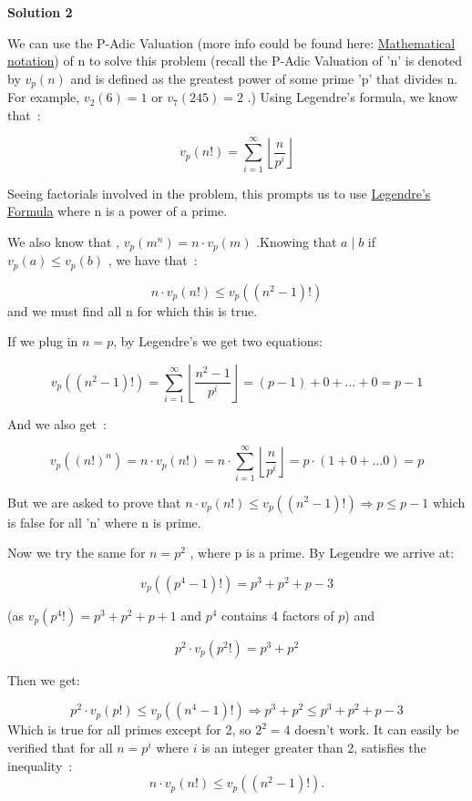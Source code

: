 \begin{enumerate}
\textbf{Solution 2}

We can use the P-Adic Valuation (more info could be found here: \href{https://artofproblemsolving.com/wiki/index.php?title=Mathematical\_notation}{Mathematical notation}) of n to solve this problem (recall the P-Adic Valuation of 'n' is denoted by $v_p (n)$ and is defined as the greatest power of some prime 'p' that divides n. For example, $v_2 (6)=1$ or $v_7 (245)=2$ .) Using Legendre's formula, we know that :

 
 \[v_p (n!)= \sum_{i=1}^\infty  \left\lfloor \frac {n}{p^i} \right\rfloor\]

 Seeing factorials involved in the problem, this prompts us to use \href{https://artofproblemsolving.com/wiki/index.php?title=Legendre\%27s\_Formula}{Legendre's Formula} where n is a power of a prime.

 We also know that , $v_p (m^n) = n \cdot v_p (m)$ .Knowing that $a\mid b$ if $v_p (a) \le v_p (b)$ , we have that :

 
 \[n \cdot v_p (n!) \le v_p ((n^2 -1 )!)\] and we must find all n for which this is true.

 If we plug in $n=p$, by Legendre's we get two equations:

 
 \[v_p ((n^2 -1)!) = \sum_{i=1}^\infty  \left\lfloor \frac {n^2 -1}{p^i} \right\rfloor = (p-1)+0+...+0 = p-1\]

 And we also get :

 
 \[v_p ((n!)^n) = n \cdot v_p (n!)= n \cdot \sum_{i=1}^\infty   \left\lfloor \frac {n}{p^i} \right\rfloor = p \cdot ( 1+0+...0) = p\]

 But we are asked to prove that $n \cdot v_p (n!) \le v_p ((n^2 -1 )!) \Longrightarrow p \le p-1$ which is false for all 'n' where n is prime.

 Now we try the same for $n=p^2$ , where p is a prime. By Legendre we arrive at:

 
 \[v_p ((p^4 -1)!) = p^3 + p^2 + p -3\] 

 (as $v_p(p^4!) = p^3 + p^2 + p + 1$ and $p^4$ contains 4 factors of $p$) and 

 
 \[p^2 \cdot v_p (p^2 !) = p^3 + p^2\]

 Then we get:

 
 \[p^2 \cdot v_p (p!) \le v_p ((n^4 -1)!) \Longrightarrow p^3 + p^2 \le p^3 + p^2 + p -3\] Which is true for all primes except for 2, so $2^2 = 4$ doesn't work. It can easily be verified that for all $n=p^i$ where $i$ is an integer greater than 2, satisfies the inequality :
 \[n \cdot v_p (n!) \le v_p ((n^2 -1 )!).\]


\end{enumerate}
